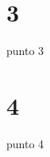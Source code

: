 \documentclass[12pt]{article}
\begin{document}
\section{3}
punto 3


\section{4}
punto 4
\end{document}
